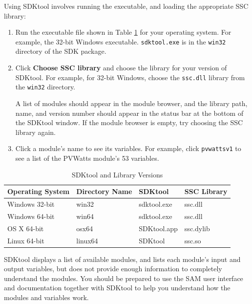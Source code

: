 \documentclass{scrartcl} %
\begin{document}
Using SDKtool involves running the executable, and loading the appropriate SSC library:

\begin{enumerate}
\item Run the executable file shown in Table \ref{tab_sdktool_versions} for your operating system. For example, the 32-bit Windows executable. \texttt{sdktool.exe} is in the \texttt{win32} directory of the SDK package.
\item Click \textbf{Choose SSC library} and choose the library for your version of SDKtool. For example, for 32-bit Windows, choose the \texttt{ssc.dll} library from the \texttt{win32} directory.

A list of modules should appear in the module browser, and the library path, name, and version number should appear in the status bar at the bottom of the SDKtool window. If the module browser is empty, try choosing the SSC library again.
\item Click a module's name to see its variables. For example, click \texttt{pvwattsv1} to see a list of the PVWatts module's 53 variables.
\end{enumerate}

\begin{table}
  \begin{center}
    \begin{tabular}{llll}
       Operating System & Directory Name & SDKtool & SSC Library \\
       \hline
       Windows 32-bit & win32 & sdktool.exe & ssc.dll \\
       Windows 64-bit & win64 & sdktool.exe & ssc.dll \\
       OS X 64-bit & osx64 & SDKtool.app & ssc.dylib \\
       Linux 64-bit & linux64 & SDKtool & ssc.so \\ 
      \hline
    \end{tabular}
    \caption{SDKtool and Library Versions}\label{tab_sdktool_versions}
  \end{center}
\end{table}

SDKtool displays a list of available modules, and lists each module's input and output variables, but does not provide enough information to completely understand the modules. You should be prepared to use the SAM user interface and documentation together with SDKtool to help you understand how the modules and variables work. 
\end{document}
